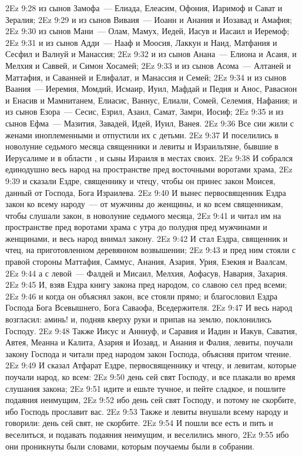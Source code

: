 \vs 2Ez 9:28 из сынов Замофа~--- Елиада, Елеасим, Офония, Иаримоф и Сават и Зералия;
\vs 2Ez 9:29 и из сынов Виваия~--- Иоанн и Анания и Иозавад и Амафия;
\vs 2Ez 9:30 из сынов Мани~--- Олам, Мамух, Иедей, Иасув и Иасаил и Иеремоф;
\vs 2Ez 9:31 и из сынов Адди~--- Нааф и Моосия, Лаккун и Наид, Матфания и Сесфил и Валнуй и Манассия;
\vs 2Ez 9:32 и из сынов Анана~--- Елиона и Асаия, и Мелхия и Саввей, и Симон Хосамей;
\vs 2Ez 9:33 и из сынов Асома~--- Алтаней и Маттафия, и Саванней и Елифалат, и Манассия и Семей;
\vs 2Ez 9:34 и из сынов Ваания~--- Иеремия, Момдий, Исмаир, Иуил, Мафдай и Педия и Анос, Равасион и Енасив и Мамнитанем, Елиасис, Ваннус, Елиали, Сомей, Селемия, Нафания; и из сынов Езора~--- Сесис, Езрил, Азаил, Самат, Замри, Иосиф;
\vs 2Ez 9:35 и из сынов Ефма~--- Мазития, Завадей, Идей, Иуил, Ванея.
\vs 2Ez 9:36 Все сии жили с женами иноплеменными и отпустили их с детьми.
\rsbpar\vs 2Ez 9:37 И поселились в новолуние седьмого месяца священники и левиты и Израильтяне, бывшие в Иерусалиме и в области , и сыны Израиля в местах своих.
\vs 2Ez 9:38 И собрался единодушно весь народ на пространстве пред восточными воротами храма,
\vs 2Ez 9:39 и сказали Ездре, священнику и чтецу, чтобы он принес закон Моисея, данный от Господа, Бога Израилева.
\vs 2Ez 9:40 И вынес первосвященник Ездра закон ко всему народу~--- от мужчины до женщины, и ко всем священникам, чтобы слушали закон, в новолуние седьмого месяца,
\vs 2Ez 9:41 и читал им  на пространстве пред воротами храма с утра до полудня пред мужчинами и женщинами, и весь народ внимал закону.
\vs 2Ez 9:42 И стал Ездра, священник и чтец, на приготовленном деревянном возвышении;
\vs 2Ez 9:43 и пред ним стояли с правой стороны Маттафия, Саммус, Анания, Азария, Урия, Езекия и Ваалсам,
\vs 2Ez 9:44 а с левой~--- Фалдей и Мисаил, Мелхия, Аофасув, Навария, Захария.
\vs 2Ez 9:45 И, взяв Ездра книгу закона пред народом, со славою сел пред всеми;
\vs 2Ez 9:46 и когда он объяснял закон, все стояли прямо; и благословил Ездра Господа Бога Всевышнего, Бога Саваофа, Вседержителя.
\vs 2Ez 9:47 И весь народ возгласил: аминь! и, подняв кверху руки и припав на землю, поклонились Господу.
\vs 2Ez 9:48 Также Иисус и Анниуф, и Саравия и Иадин и Иакув, Саватия, Автея, Меанна и Калита, Азария и Иозавд, и Анания и Фалия, левиты, поучали закону Господа и читали пред народом закон Господа, объясняя притом чтение.
\rsbpar\vs 2Ez 9:49 И сказал Атфарат Ездре, первосвященнику и чтецу, и левитам, которые поучали народ, ко всем:
\vs 2Ez 9:50 день сей свят Господу, и все плакали во время слушания закона;
\vs 2Ez 9:51 идите и ешьте тучное, и пейте сладкое, и пошлите подаяния неимущим,
\vs 2Ez 9:52 ибо день сей свят Господу, и потому не скорбите, ибо Господь прославит вас.
\vs 2Ez 9:53 Также и левиты внушали всему народу и говорили: день сей свят, не скорбите.
\vs 2Ez 9:54 И пошли все есть и пить и веселиться, и подавать подаяния неимущим, и веселились много,
\vs 2Ez 9:55 ибо они проникнуты были словами, которым поучаемы были в собрании.
